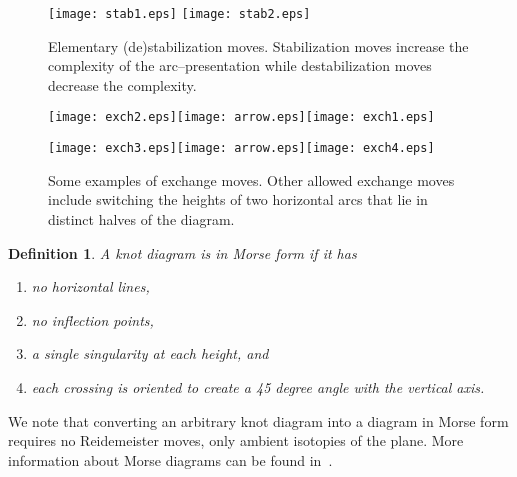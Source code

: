 \documentclass{amsart}
\newtheorem{definition}{Definition}
\begin{document}
\begin{figure}[h]
\begin{center}
\texttt{[image: stab1.eps]}
\texttt{[image: stab2.eps]}
\end{center}
\caption{ \small{Elementary (de)stabilization moves. Stabilization moves increase the complexity of the arc--presentation while destabilization moves decrease the complexity.}}
\label{stab}
\end{figure}


\begin{figure}[h]
\begin{center}
\texttt{[image: exch2.eps]}\texttt{[image: arrow.eps]}\texttt{[image: exch1.eps]}
\end{center}

\begin{center}
\texttt{[image: exch3.eps]}\texttt{[image: arrow.eps]}\texttt{[image: exch4.eps]}
\end{center}
\caption{ \small{Some examples of exchange moves. Other allowed exchange moves include switching the heights of two horizontal arcs that lie in distinct halves of the diagram.}}
\label{exch}
\end{figure}



\begin{definition} A knot diagram is in \emph{Morse form} if it has

\begin{enumerate}
\item no horizontal lines, 
\item no inflection points,
\item a single singularity at each height, and 
\item each crossing is oriented to create a 45 degree angle with the vertical axis.
\end{enumerate}
\end{definition}

We note that converting an arbitrary knot diagram into a diagram in Morse form requires no Reidemeister moves, only ambient isotopies of the plane. More information about Morse diagrams can be found in~\cite{lou}.
\end{document}
